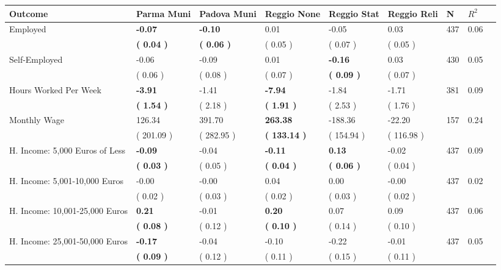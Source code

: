 \begin{tabular}{L{6.2cm} C{1.8cm} C{1.8cm} C{1.8cm} C{1.8cm} C{1.8cm} C{1.8cm} C{0.3cm} C{0.3cm}}
\toprule
 \textbf{Outcome} & \textbf{Parma Muni} & \textbf{Padova Muni} & \textbf{Reggio None} & \textbf{Reggio Stat} & \textbf{Reggio Reli} & \textbf{N} & \textbf{$ R^2$} \\
\midrule
Employed & \textbf{    -0.07} & \textbf{    -0.10} &      0.01 &     -0.05 &      0.03  & 437 &       0.06 \\ 
 & \textbf{(     0.04 )} & \textbf{(     0.06 )} & (     0.05 ) & (     0.07 ) & (     0.05 )  & \\
Self-Employed &     -0.06 &     -0.09 &      0.01 & \textbf{    -0.16} &      0.03  & 430 &       0.05 \\ 
 & (     0.06 ) & (     0.08 ) & (     0.07 ) & \textbf{(     0.09 )} & (     0.07 )  & \\
Hours Worked Per Week & \textbf{    -3.91} &     -1.41 & \textbf{    -7.94} &     -1.84 &     -1.71  & 381 &       0.09 \\ 
 & \textbf{(     1.54 )} & (     2.18 ) & \textbf{(     1.91 )} & (     2.53 ) & (     1.76 )  & \\
Monthly Wage &    126.34 &    391.70 & \textbf{   263.38} &   -188.36 &    -22.20  & 157 &       0.24 \\ 
 & (   201.09 ) & (   282.95 ) & \textbf{(   133.14 )} & (   154.94 ) & (   116.98 )  & \\
H. Income: 5,000 Euros of Less & \textbf{    -0.09} &     -0.04 & \textbf{    -0.11} & \textbf{     0.13} &     -0.02  & 437 &       0.09 \\ 
 & \textbf{(     0.03 )} & (     0.05 ) & \textbf{(     0.04 )} & \textbf{(     0.06 )} & (     0.04 )  & \\
H. Income: 5,001-10,000 Euros &     -0.00 &     -0.00 &      0.04 &      0.00 &     -0.00  & 437 &       0.02 \\ 
 & (     0.02 ) & (     0.03 ) & (     0.02 ) & (     0.03 ) & (     0.02 )  & \\
H. Income: 10,001-25,000 Euros & \textbf{     0.21} &     -0.01 & \textbf{     0.20} &      0.07 &      0.09  & 437 &       0.06 \\ 
 & \textbf{(     0.08 )} & (     0.12 ) & \textbf{(     0.10 )} & (     0.14 ) & (     0.10 )  & \\
H. Income: 25,001-50,000 Euros & \textbf{    -0.17} &     -0.04 &     -0.10 &     -0.22 &     -0.01  & 437 &       0.05 \\ 
 & \textbf{(     0.09 )} & (     0.12 ) & (     0.11 ) & (     0.15 ) & (     0.11 )  & \\

\end{tabular}
